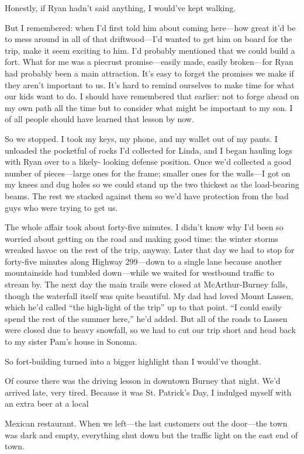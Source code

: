 \documentclass[12pt]{book}
\begin{document}
Honestly, if Ryan hadn't said anything, I would've kept walking.

But I remembered: when I'd first told him about coming here---how great it'd be to mess around in all of that driftwood---I'd wanted to get him on board for the trip, make it seem exciting to him. I'd probably mentioned that we could build a fort. What for me was a piecrust promise---easily made, easily broken---for Ryan had probably been a main attraction. It's easy to forget the promises we make if they aren't important to us. It's hard to remind ourselves to make time for what our kids want to do. I should have remembered that earlier: not to forge ahead on my own path all the time but to consider what might be important to my son. I of all people should have learned that lesson by now.

So we stopped. I took my keys, my phone, and my wallet out of my pants. I unloaded the pocketful of rocks I'd collected for Linda, and I began hauling logs with Ryan over to a likely- looking defense position. Once we'd collected a good number of pieces---large ones for the frame; smaller ones for the walls---I got on my knees and dug holes so we could stand up the two thickest as the load-bearing beams. The rest we stacked against them so we'd have protection from the bad guys who were trying to get us.

The whole affair took about forty-five minutes. I didn't know why I'd been so worried about getting on the road and making good time: the winter storms wreaked havoc on the rest of the trip, anyway. Later that day we had to stop for forty-five minutes along Highway 299---down to a single lane because another mountainside had tumbled down---while we waited for westbound traffic to stream by. The next day the main trails were closed at McArthur-Burney falls, though the waterfall itself was quite beautiful. My dad had loved Mount Lassen, which he'd called ``the high-light of the trip'' up to that point. ``I could easily spend the rest of the summer here,'' he'd added. But all of the roads to Lassen were closed due to heavy snowfall, so we had to cut our trip short and head back to my sister Pam's house in Sonoma.

So fort-building turned into a bigger highlight than I would've thought.

Of course there was the driving lesson in downtown Burney that night. We'd arrived late, very tired. Because it was St. Patrick's Day, I indulged myself with an extra beer at a local

Mexican restaurant. When we left---the last customers out the door---the town was dark and empty, everything shut down but the traffic light on the east end of town.
\end{document}
